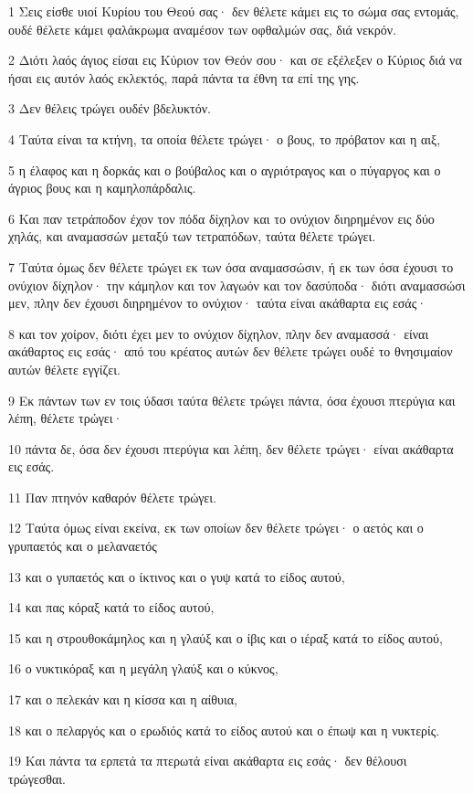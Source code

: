 \par 1 Σεις είσθε υιοί Κυρίου του Θεού σας· δεν θέλετε κάμει εις το σώμα σας εντομάς, ουδέ θέλετε κάμει φαλάκρωμα αναμέσον των οφθαλμών σας, διά νεκρόν.
\par 2 Διότι λαός άγιος είσαι εις Κύριον τον Θεόν σου· και σε εξέλεξεν ο Κύριος διά να ήσαι εις αυτόν λαός εκλεκτός, παρά πάντα τα έθνη τα επί της γης.
\par 3 Δεν θέλεις τρώγει ουδέν βδελυκτόν.
\par 4 Ταύτα είναι τα κτήνη, τα οποία θέλετε τρώγει· ο βους, το πρόβατον και η αιξ,
\par 5 η έλαφος και η δορκάς και ο βούβαλος και ο αγριότραγος και ο πύγαργος και ο άγριος βους και η καμηλοπάρδαλις.
\par 6 Και παν τετράποδον έχον τον πόδα δίχηλον και το ονύχιον διηρημένον εις δύο χηλάς, και αναμασσών μεταξύ των τετραπόδων, ταύτα θέλετε τρώγει.
\par 7 Ταύτα όμως δεν θέλετε τρώγει εκ των όσα αναμασσώσιν, ή εκ των όσα έχουσι το ονύχιον δίχηλον· την κάμηλον και τον λαγωόν και τον δασύποδα· διότι αναμασσώσι μεν, πλην δεν έχουσι διηρημένον το ονύχιον· ταύτα είναι ακάθαρτα εις εσάς·
\par 8 και τον χοίρον, διότι έχει μεν το ονύχιον δίχηλον, πλην δεν αναμασσά· είναι ακάθαρτος εις εσάς· από του κρέατος αυτών δεν θέλετε τρώγει ουδέ το θνησιμαίον αυτών θέλετε εγγίζει.
\par 9 Εκ πάντων των εν τοις ύδασι ταύτα θέλετε τρώγει πάντα, όσα έχουσι πτερύγια και λέπη, θέλετε τρώγει·
\par 10 πάντα δε, όσα δεν έχουσι πτερύγια και λέπη, δεν θέλετε τρώγει· είναι ακάθαρτα εις εσάς.
\par 11 Παν πτηνόν καθαρόν θέλετε τρώγει.
\par 12 Ταύτα όμως είναι εκείνα, εκ των οποίων δεν θέλετε τρώγει· ο αετός και ο γρυπαετός και ο μελαναετός
\par 13 και ο γυπαετός και ο ίκτινος και ο γυψ κατά το είδος αυτού,
\par 14 και πας κόραξ κατά το είδος αυτού,
\par 15 και η στρουθοκάμηλος και η γλαύξ και ο ίβις και ο ιέραξ κατά το είδος αυτού,
\par 16 ο νυκτικόραξ και η μεγάλη γλαύξ και ο κύκνος,
\par 17 και ο πελεκάν και η κίσσα και η αίθυια,
\par 18 και ο πελαργός και ο ερωδιός κατά το είδος αυτού και ο έπωψ και η νυκτερίς.
\par 19 Και πάντα τα ερπετά τα πτερωτά είναι ακάθαρτα εις εσάς· δεν θέλουσι τρώγεσθαι.
